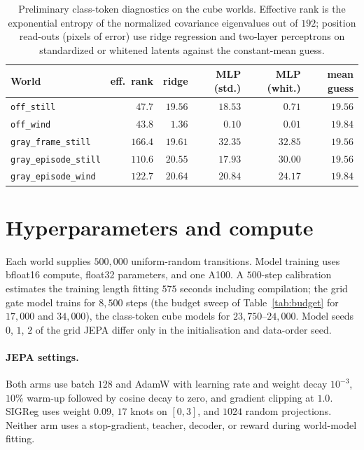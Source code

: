\begin{table}[ht]
\centering
\caption{Preliminary class-token diagnostics on the cube worlds. Effective rank is the exponential
entropy of the normalized covariance eigenvalues out of $192$; position read-outs (pixels of error)
use ridge regression and two-layer perceptrons on standardized or whitened latents against the
constant-mean guess.}
\label{tab:diag}
\vspace{0.5em}
\begin{tabular}{lrrrrr}
\toprule
World & eff.\ rank & ridge & MLP (std.) & MLP (whit.) & mean guess \\
\midrule
\texttt{off\_still}           & $47.7$  & $19.56$ & $18.53$ & $0.71$  & $19.56$ \\
\texttt{off\_wind}            & $43.8$  & $1.36$  & $0.10$  & $0.01$  & $19.84$ \\
\texttt{gray\_frame\_still}   & $166.4$ & $19.61$ & $32.35$ & $32.85$ & $19.56$ \\
\texttt{gray\_episode\_still} & $110.6$ & $20.55$ & $17.93$ & $30.00$ & $19.56$ \\
\texttt{gray\_episode\_wind}  & $122.7$ & $20.64$ & $20.84$ & $24.17$ & $19.84$ \\
\bottomrule
\end{tabular}
\end{table}

\section{Hyperparameters and compute}
\label{app:hparams}

Each world supplies $500{,}000$ uniform-random transitions. Model training uses bfloat16 compute,
float32 parameters, and one A100. A $500$-step calibration estimates the training length fitting
$575$ seconds including compilation; the grid gate model trains for $8{,}500$ steps (the budget sweep
of Table~\ref{tab:budget} for $17{,}000$ and $34{,}000$), the class-token cube models for $23{,}750$--$24{,}000$.
Model seeds $0$, $1$, $2$ of the grid JEPA differ only in the initialisation and data-order seed.

\paragraph{JEPA settings.}
Both arms use batch $128$ and AdamW with learning rate and weight decay $10^{-3}$, $10\%$ warm-up
followed by cosine decay to zero, and gradient clipping at $1.0$. SIGReg uses weight $0.09$, $17$
knots on $[0,3]$, and $1024$ random projections. Neither arm uses a stop-gradient, teacher, decoder, or
reward during world-model fitting.

